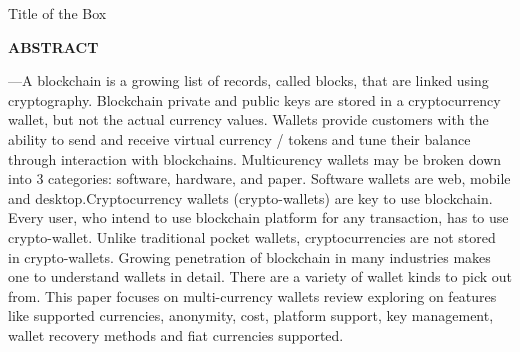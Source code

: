 \documentclass[12pt]{article}
\begin{document}
\begin{boxed}{Title of the Box}
\newpage
\vspace*{50px}
\begin{center} \large \bf{ABSTRACT} \end{center}
               
\vspace{30px}
—A blockchain is a growing list of records, 
called blocks, that are linked using cryptography. 
Blockchain private and public keys are stored in a 
cryptocurrency wallet, but not the actual currency 
values. Wallets provide customers with the ability to 
send and receive virtual currency / tokens and tune their 
balance through interaction with blockchains. Multicurency wallets may be broken down into 3 categories: 
software, hardware, and paper. Software wallets are 
web, mobile and desktop.Cryptocurrency wallets (crypto-wallets) are key to use
blockchain. Every user, who intend to use blockchain
platform for any transaction, has to use crypto-wallet.
Unlike traditional pocket wallets, cryptocurrencies are not
stored in crypto-wallets. Growing penetration of 
blockchain in many industries makes one to understand 
wallets in detail. There are a variety of wallet kinds to 
pick out from. This paper focuses on multi-currency 
wallets review exploring on features like supported 
currencies, anonymity, cost, platform support, key 
management, wallet recovery methods and fiat 
currencies supported.

\newpage
\tableofcontents
\clearpage
\listoffigures
\clearpage
\renewcommand{\headrulewidth}{0.0pt}
\pagestyle{plain}

\end{boxed}
\pagestyle{fancyplain}




\newpage



\thispagestyle{plain}

\pagestyle{plain}
\cfoot{\thepage}



\end{document}
